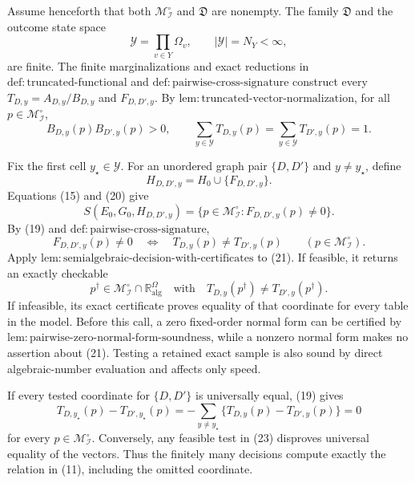 Assume henceforth that both \(\mathcal M_{\mathcal I}^{\circ}\) and \(\mathfrak D\) are nonempty.  The family \(\mathfrak D\) and the outcome state space
\[
 \mathcal Y=\prod_{v\in Y}\Omega_v,
 \qquad |\mathcal Y|=N_Y<\infty, \tag{18}
\]
are finite.  The finite marginalizations and exact reductions in \(\mathrm{def{:}truncated\text{-}functional}\) and \(\mathrm{def{:}pairwise\text{-}cross\text{-}signature}\) construct every \(T_{D,y}=A_{D,y}/B_{D,y}\) and \(F_{D,D',y}\).  By \(\mathrm{lem{:}truncated\text{-}vector\text{-}normalization}\), for all \(p\in\mathcal M_{\mathcal I}^{\circ}\),
\[
 B_{D,y}(p)B_{D',y}(p)>0,
 \qquad
 \sum_{y\in\mathcal Y}T_{D,y}(p)=
 \sum_{y\in\mathcal Y}T_{D',y}(p)=1. \tag{19}
\]

Fix the first cell \(y_\star\in\mathcal Y\).  For an unordered graph pair \(\{D,D'\}\) and \(y\neq y_\star\), define
\[
 H_{D,D',y}=H_0\cup\{F_{D,D',y}\}. \tag{20}
\]
Equations (15) and (20) give
\[
 S(E_0,G_0,H_{D,D',y})
 =\{p\in\mathcal M_{\mathcal I}^{\circ}:F_{D,D',y}(p)\neq0\}. \tag{21}
\]
By (19) and \(\mathrm{def{:}pairwise\text{-}cross\text{-}signature}\),
\[
 F_{D,D',y}(p)\neq0
 \quad\Longleftrightarrow\quad
 T_{D,y}(p)\neq T_{D',y}(p)
 \qquad(p\in\mathcal M_{\mathcal I}^{\circ}). \tag{22}
\]
Apply \(\mathrm{lem{:}semialgebraic\text{-}decision\text{-}with\text{-}certificates}\) to (21).  If feasible, it returns an exactly checkable
\[
 p^\dagger\in\mathcal M_{\mathcal I}^{\circ}\cap\mathbb R_{\mathrm{alg}}^\Omega
 \quad\text{with}\quad
 T_{D,y}(p^\dagger)\neq T_{D',y}(p^\dagger). \tag{23}
\]
If infeasible, its exact certificate proves equality of that coordinate for every table in the model.  Before this call, a zero fixed-order normal form can be certified by \(\mathrm{lem{:}pairwise\text{-}zero\text{-}normal\text{-}form\text{-}soundness}\), while a nonzero normal form makes no assertion about (21).  Testing a retained exact sample is also sound by direct algebraic-number evaluation and affects only speed.

If every tested coordinate for \(\{D,D'\}\) is universally equal, (19) gives
\[
 T_{D,y_\star}(p)-T_{D',y_\star}(p)
 =-\sum_{y\neq y_\star}
 \{T_{D,y}(p)-T_{D',y}(p)\}=0 \tag{24}
\]
for every \(p\in\mathcal M_{\mathcal I}^{\circ}\).  Conversely, any feasible test in (23) disproves universal equality of the vectors.  Thus the finitely many decisions compute exactly the relation in (11), including the omitted coordinate.

